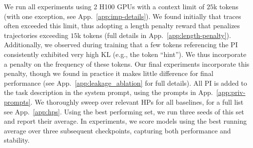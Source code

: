 \documentclass[]{servicenow} %
\begin{document}
We run all experiments using 2 H100 GPUs with a context limit of $25$k tokens (with one exception, see App.~\ref{app:imp-details}). We found initially that traces often exceeded this limit, thus adopting a length penalty reward that penalizes trajectories exceeding $15$k tokens (full details in App.~\ref{app:length-penalty}). Additionally, we observed during training that a few tokens referencing the PI consistently exhibited very high KL (e.g., the token ``hint''). We thus incorporate a penalty on the frequency of these tokens. Our final experiments incorporate this penalty, though we found in practice it makes little difference for final performance (see App.~\ref{app:leakage_ablation} for full details). All PI is added to the task description in the system prompt, using the prompts in App.~\ref{app:priv-prompts}.  We thoroughly sweep over relevant HPs for all baselines, for a full list see App.~\ref{app:hps}. Using the best performing set, we run three seeds of this set and report their average.  In experiments, we score models using the best running average over three subsequent checkpoints, capturing both performance and stability. 
\end{document}
